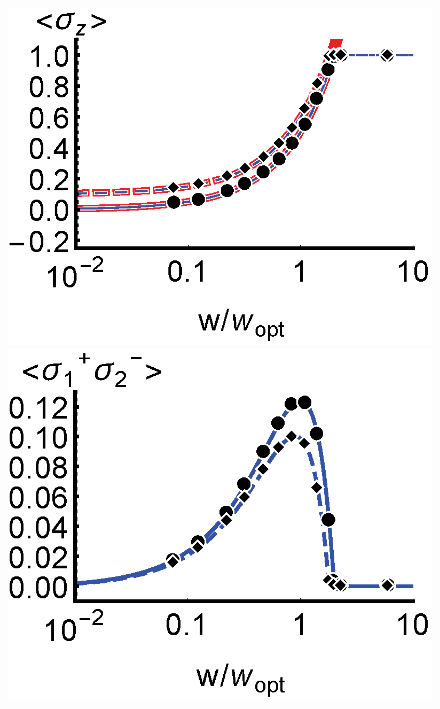 \documentclass[aps,
twocolumn,
superscriptaddress,groupedaddress]{revtex4}
\begin{document}
\begin{figure}
\begin{center}
	\includegraphics[scale =0.445] {N10000SZ.eps}
	\hspace{-5.0mm} \includegraphics[scale =0.445] {N10000SPSM.eps}

\end{center}
\end{figure}
\end{document}
